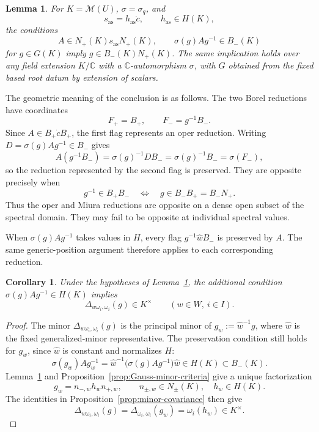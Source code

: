 \documentclass[11pt,leqno]{amsart}
\numberwithin{equation}{section}
\theoremstyle{plain}
\newtheorem{lemma}[theorem]{Lemma}
\newtheorem{corollary}[theorem]{Corollary}
\theoremstyle{definition}
\theoremstyle{plain}
\theoremstyle{definition}
\theoremstyle{remark}
\begin{document}
\begin{lemma}\label{lem:difference-field-generic-position}
For $K=\mathcal M(U)$, $\sigma=\sigma_q$, and
\[
 s_{\mathrm{as}}=h_{\mathrm{as}}\dot c,\qquad h_{\mathrm{as}}\in H(K),
\]
the conditions
\[
 A\in N_+(K)s_{\mathrm{as}} N_+(K),
 \qquad
 \sigma(g)A g^{-1}\in B_-(K)
\]
for $g\in G(K)$ imply $g\in B_-(K)N_+(K)$.
The same implication holds over any field extension $K/\mathbb C$ with a $\mathbb C$-automorphism $\sigma$, with $G$ obtained from the fixed based root datum by extension of scalars.
\end{lemma}

The geometric meaning of the conclusion is as follows.  The two Borel reductions have coordinates
\[
 F_+=B_+,\qquad F_-=g^{-1}B_-.
\]
Since $A\in B_+\dot cB_+$, the first flag represents an oper reduction.  Writing $D=\sigma(g)Ag^{-1}\in B_-$ gives
\[
 A(g^{-1}B_-)=\sigma(g)^{-1}DB_-
             =\sigma(g)^{-1}B_-=\sigma(F_-),
\]
so the reduction represented by the second flag is preserved.  They are opposite precisely when
\[
 g^{-1}\in B_+B_-\quad\Longleftrightarrow\quad
 g\in B_-B_+=B_-N_+.
\]
Thus the oper and Miura reductions are opposite on a dense open subset of the spectral domain.  They may fail to be opposite at individual spectral values.

When $\sigma(g)Ag^{-1}$ takes values in $H$, every flag $g^{-1}\widehat wB_-$ is preserved by $A$. The same generic-position argument therefore applies to each corresponding reduction.
\begin{corollary}\label{cor:Cartan-preservation-Weyl-minors}
Under the hypotheses of Lemma~\ref{lem:difference-field-generic-position}, the additional condition $\sigma(g)Ag^{-1}\in H(K)$ implies
\[
 \Delta_{w\omega_i,\omega_i}(g)\in K^\times
 \qquad(w\in W,\ i\in I).
\]
\end{corollary}
\begin{proof}
The minor $\Delta_{w\omega_i,\omega_i}(g)$ is the principal minor of $g_w:=\widehat w^{-1}g$, where $\widehat w$ is the fixed generalized-minor representative. The preservation condition still holds for $g_w$, since $\widehat w$ is constant and normalizes $H$:
\[
 \sigma(g_w)Ag_w^{-1}
 =\widehat w^{-1}\bigl(\sigma(g)Ag^{-1}\bigr)\widehat w
 \in H(K)\subset B_-(K).
\]
Lemma~\ref{lem:difference-field-generic-position} and Proposition~\ref{prop:Gauss-minor-criteria} give a unique factorization
\[
 g_w=n_{-,w}h_wn_{+,w},\qquad
 n_{\pm,w}\in N_\pm(K),\quad h_w\in H(K).
\]
The identities in Proposition~\ref{prop:minor-covariance} then give
\[
 \Delta_{w\omega_i,\omega_i}(g)
 =\Delta_{\omega_i,\omega_i}(g_w)
 =\omega_i(h_w)\in K^\times.
\]
\end{proof}
\end{document}
